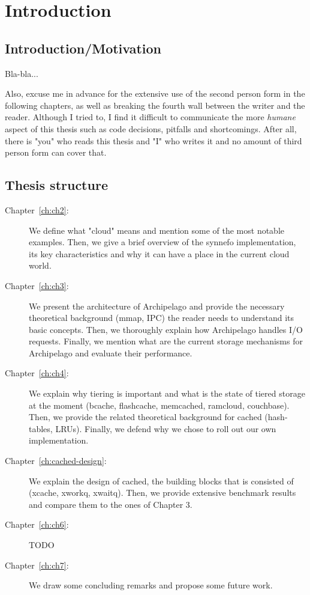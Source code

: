 \chapter{Introduction}\label{ch:intro}

\section{Introduction/Motivation}

Bla-bla...

Also, excuse me in advance for the extensive use of the second person form in 
the following chapters, as well as breaking the fourth wall between the writer 
and the reader. Although I tried to, I find it difficult to communicate the more 
\textit{humane} aspect of this thesis such as code decisions, pitfalls and 
shortcomings.  After all, there is "you" who reads this thesis and "I" who 
writes it and no amount of third person form can cover that.

\section{Thesis structure}

\begin{description}
\item[Chapter~\ref{ch:ch2}:]
We define what "cloud" means and mention some of the most notable examples.
Then, we give a brief overview of the synnefo implementation, its key
characteristics and why it can have a place in the current cloud world.
\item[Chapter~\ref{ch:ch3}:]
We present the architecture of Archipelago and provide the necessary theoretical
background (mmap, IPC) the reader needs to understand its basic concepts. Then,
we thoroughly explain how Archipelago handles I/O requests. Finally, we mention
what are the current storage mechanisms for Archipelago and evaluate their
performance.
\item[Chapter~\ref{ch:ch4}:]
We explain why tiering is important and what is the state of tiered storage at
the moment (bcache, flashcache, memcached, ramcloud, couchbase).  Then, we
provide the related theoretical background for cached (hash-tables, LRUs).
Finally, we defend why we chose to roll out our own implementation.
\item[Chapter~\ref{ch:cached-design}:]
We explain the design of cached, the building blocks that is consisted of
(xcache, xworkq, xwaitq). Then, we provide extensive benchmark results and
compare them to the ones of Chapter 3.
\item[Chapter~\ref{ch:ch6}:]
TODO
\item[Chapter~\ref{ch:ch7}:]
We draw some concluding remarks and propose some future work.
\end{description}

